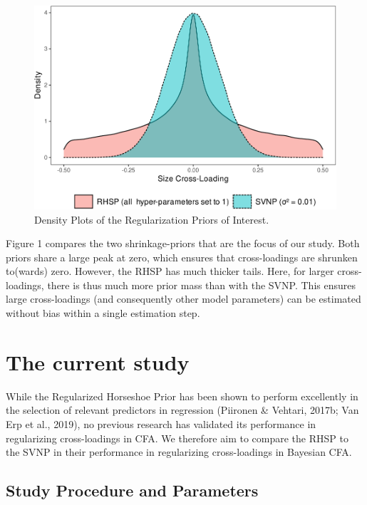 \documentclass[
  man, donotrepeattitle,floatsintext]{apa6}
\begin{document}
\begin{figure}
\centering
\includegraphics{JMBKoch_thesis_files/figure-latex/unnamed-chunk-1-1.pdf}
\caption{\label{fig:unnamed-chunk-1}Density Plots of the Regularization Priors of Interest.}
\end{figure}

Figure 1 compares the two shrinkage-priors that are the focus of our study. Both priors share a large peak at zero, which ensures that cross-loadings are shrunken to(wards) zero. However, the RHSP has much thicker tails. Here, for larger cross-loadings, there is thus much more prior mass than with the SVNP. This ensures large cross-loadings (and consequently other model parameters) can be estimated without bias within a single estimation step.

\hypertarget{the-current-study}{%
\section{The current study}\label{the-current-study}}

While the Regularized Horseshoe Prior has been shown to perform excellently in the selection of relevant predictors in regression (Piironen \& Vehtari, 2017b; Van Erp et al., 2019), no previous research has validated its performance in regularizing cross-loadings in CFA. We therefore aim to compare the RHSP to the SVNP in their performance in regularizing cross-loadings in Bayesian CFA.

\hypertarget{study-procedure-and-parameters}{%
\subsection{Study Procedure and Parameters}\label{study-procedure-and-parameters}}
\end{document}

